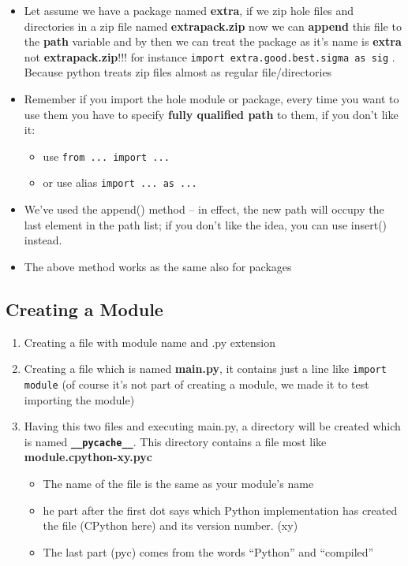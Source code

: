 \documentclass[11pt]{article}
\begin{document}
\begin{itemize}
\item Let assume we have a package named \textbf{extra}, if we zip hole files and
directories in a zip file named \textbf{extrapack.zip} now we can \textbf{append}
this file to the \textbf{path} variable and by then we can treat the
package as it's name is \textbf{extra} not \textbf{extrapack.zip}!!! for instance
\texttt{import extra.good.best.sigma as sig} . Because python treats zip
files almost as regular file/directories
\item Remember if you import the hole module or package, every time you
want to use them you have to specify \textbf{fully qualified path} to them,
if you don't like it: 
\begin{itemize}
\item use \texttt{from ... import ...}
\item or use alias \texttt{import ... as ...}
\end{itemize}
\item We’ve used the append() method – in effect, the new path will occupy
the last element in the path list; if you don’t like the idea, you can
use insert() instead.
\item The above method works as the same also for packages

\newpage
\end{itemize}
\subsection{Creating a Module}
\label{sec:orgba7d112}
\begin{enumerate}
\item Creating a file with module name and .py extension
\item Creating a file which is named \textbf{main.py}, it contains just a line
like \texttt{import module} (of course it's not part of creating a module,
we made it to test importing the module)
\item Having this two files and executing main.py, a directory will be
created which is named \textbf{\texttt{\_\_pycache\_\_}}. This directory contains a
file most like \textbf{module.cpython-xy.pyc}
\begin{itemize}
\item The name of the file is the same as your module’s name
\item he part after the first dot says which Python implementation has
created the file (CPython here) and its version number. (xy)
\item The last part (pyc) comes from the words “Python” and “compiled”
\end{itemize}
\end{enumerate}
\end{document}
